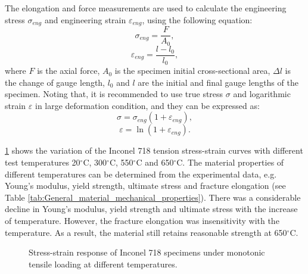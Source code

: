 The elongation and force measurements are used to calculate the engineering stress $\sigma_{eng}$ and engineering strain $\varepsilon_{eng}$, using the following equation:
\begin{equation}
\sigma_{eng}=\frac{F}{A_0},
\end{equation}
\begin{equation}
\varepsilon_{eng}=\frac{l-l_0}{l_0},
\end{equation}
where $F$ is the axial force, $A_0$ is the specimen initial cross-sectional area, $\Delta l$ is the change of gauge length, $l_0$ and $l$ are the initial and final gauge lengths of the specimen.
Noting that, it is recommended to use true stress $\sigma$ and logarithmic strain $\varepsilon$ in large deformation condition, and they can be expressed as:
\begin{equation}
\sigma=\sigma_{eng}(1+\varepsilon_{eng}),
\end{equation}
\begin{equation}
\varepsilon=\ln(1+\varepsilon_{eng}).
\end{equation}

\ref{Fig:IN718_Monotonic_Tension} shows the variation of the Inconel 718 tension stress-strain curves with different test temperatures 20$^{\circ}$C, 300$^{\circ}$C, 550$^{\circ}$C and 650$^{\circ}$C.
The material properties of different temperatures can be determined from the experimental data, e.g. Young's modulus, yield strength, ultimate stress and fracture elongation (see Table \ref{tab:General_material_mechanical_properties}).
There was a considerable decline in Young's modulus, yield strength and ultimate stress with the increase of temperature.
However, the fracture elongation was insensitivity with the temperature.
As a result, the material still retains reasonable strength at 650$^{\circ}$C.

\begin{figure}[!htp]
\centering{}
\caption{Stress-strain response of Inconel 718 specimens under monotonic tensile loading at different temperatures.}
\label{Fig:IN718_Monotonic_Tension}
\end{figure}

